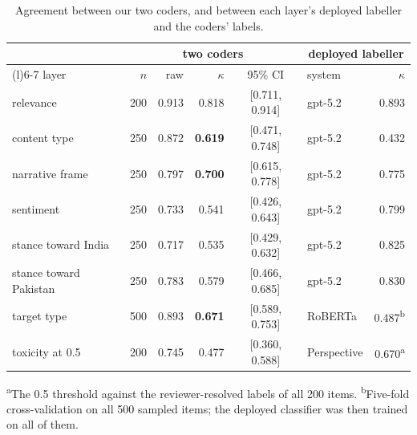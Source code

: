 \begin{table}[H]
\centering
\caption{Agreement between our two coders, and between each layer's deployed
labeller and the coders' labels.}
\label{tab:reliability}
\small
\setlength{\tabcolsep}{3pt}
\begin{tabularx}{\linewidth}{@{}>{\raggedright\arraybackslash}Xrrrcl r@{}}
\toprule
 & \multicolumn{4}{c}{two coders} & \multicolumn{2}{c}{deployed labeller} \\
\cmidrule(lr){2-5}\cmidrule(l){6-7}
layer & $n$ & raw & $\kappa$ & 95\% CI & system & $\kappa$ \\
\midrule
relevance & 200 & 0.913 & 0.818 & [0.711, 0.914] & gpt-5.2 & 0.893 \\
content type & 250 & 0.872 & \textbf{0.619} & [0.471, 0.748] & gpt-5.2 & 0.432 \\
narrative frame & 250 & 0.797 & \textbf{0.700} & [0.615, 0.778] & gpt-5.2 & 0.775 \\
sentiment & 250 & 0.733 & 0.541 & [0.426, 0.643] & gpt-5.2 & 0.799 \\
stance toward India & 250 & 0.717 & 0.535 & [0.429, 0.632] & gpt-5.2 & 0.825  \\
stance toward Pakistan & 250 & 0.783 & 0.579 & [0.466, 0.685] & gpt-5.2 & 0.830 \\
target type & 500 & 0.893 & \textbf{0.671} & [0.589, 0.753] & RoBERTa & 0.487\textsuperscript{b} \\
toxicity at 0.5 & 200 & 0.745 & 0.477 & [0.360, 0.588] & Perspective & 0.670\textsuperscript{a} \\
\bottomrule
\end{tabularx}
\vspace{2pt}
{\footnotesize \textsuperscript{a}The 0.5 threshold against the reviewer-resolved labels of all
200 items. \textsuperscript{b}Five-fold cross-validation on all 500 sampled
items; the deployed classifier was then trained on all of them.\par}
\end{table}
